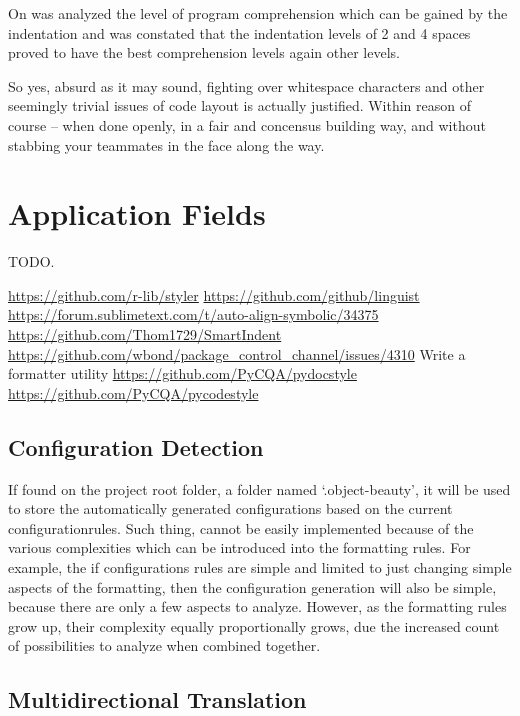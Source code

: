 On  was analyzed the level of program
comprehension which can be gained by the indentation and was constated that
the indentation levels of 2 and 4 spaces proved to have the best
comprehension levels again other levels.

\begin{citacao}
So yes, absurd as it may sound, fighting over whitespace characters and other seemingly
trivial issues of code layout is actually justified. Within reason of course -- when done
openly, in a fair and concensus building way, and without stabbing your teammates in the
face along the way. \cite{Atwood}
\end{citacao}



\section{Application Fields}

TODO.

\url{https://github.com/r-lib/styler}
\url{https://github.com/github/linguist}
\url{https://forum.sublimetext.com/t/auto-align-symbolic/34375}
\url{https://github.com/Thom1729/SmartIndent}
\url{https://github.com/wbond/package_control_channel/issues/4310} Write a formatter utility
\url{https://github.com/PyCQA/pydocstyle}
\url{https://github.com/PyCQA/pycodestyle}



\subsection{Configuration Detection}

If found on the project root folder,
a folder named `.object-beauty',
it will be used to store the automatically generated configurations based on the current configuration\s rules.
Such thing,
cannot be easily implemented because of the various complexities which can be introduced into the formatting rules.
For example,
the if configurations rules are simple and limited to just changing simple aspects of the formatting,
then the configuration generation will also be simple,
because there are only a few aspects to analyze.
However,
as the formatting rules grow up,
their complexity equally proportionally grows,
due the increased count of possibilities to analyze when combined together.


\subsection{Multidirectional Translation}

